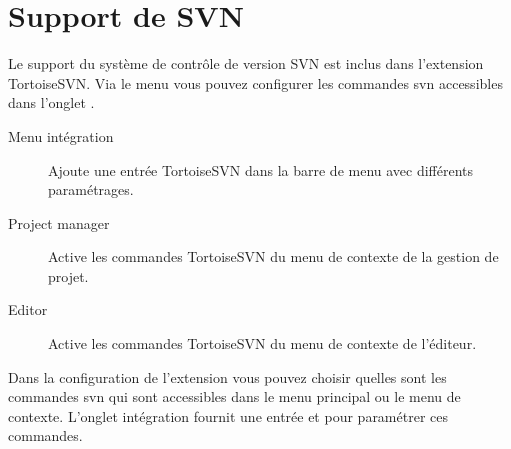 \section{Support de SVN}\label{sec:svn}


Le support du système de contrôle de version SVN est inclus dans l'extension \codeblocks TortoiseSVN. Via le menu  vous pouvez configurer les commandes svn accessibles dans l'onglet .

\begin{description}
\item[Menu intégration] Ajoute une entrée TortoiseSVN dans la barre de menu avec différents paramétrages.
\item[Project manager] Active les commandes TortoiseSVN du menu de contexte de la gestion de projet.
\item[Editor] Active les commandes TortoiseSVN du menu de contexte de l'éditeur.
\end{description}

Dans la configuration de l'extension vous pouvez choisir quelles sont les commandes svn qui sont accessibles dans le menu principal ou le menu de contexte. L'onglet intégration fournit une entrée  et  pour paramétrer ces commandes.

